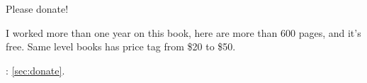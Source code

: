 \begin{center}
\vspace*{\fill}

\Huge{}
{Please donate}!
\normalsize

\bigskip
\bigskip
\bigskip

\Large{}
{I worked more than one year on this book, here are more than 600 pages, and it's free.
Same level books has price tag from \$20 to \$50.}
\normalsize

\bigskip
\bigskip
\bigskip

: \ref{sec:donate}.

\vspace*{\fill}
\vfill
\end{center}
